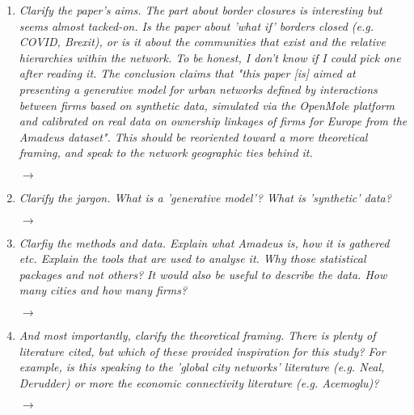 \documentclass[10pt,a4paper,sans]{moderncv}        %
\begin{document}
\begin{enumerate}
	

	\item \textit{Clarify the paper's aims. The part about border closures is interesting but seems almost tacked-on. Is the paper about 'what if' borders closed (e.g. COVID, Brexit), or is it about the communities that exist and the relative hierarchies within the network. To be honest, I don't know if I could pick one after reading it. The conclusion claims that "this paper [is] aimed at presenting a generative model for urban networks defined by interactions between firms based on synthetic data, simulated via the OpenMole platform and calibrated on real data on ownership linkages of firms for Europe from the Amadeus dataset". This should be reoriented toward a more theoretical framing, and speak to the network geographic ties behind it.}
	
	$\rightarrow$ 
	
	\medskip

	\item \textit{Clarify the jargon. What is a 'generative model'? What is 'synthetic' data?}

	$\rightarrow$ 
	
	\medskip

	\item \textit{Clarfiy the methods and data. Explain what Amadeus is, how it is gathered etc. Explain the tools that are used to analyse it. Why those statistical packages and not others? It would also be useful to describe the data. How many cities and how many firms?}
	
	$\rightarrow$ 
	
	\medskip

	\item \textit{And most importantly, clarify the theoretical framing. There is plenty of literature cited, but which of these provided inspiration for this study? For example, is this speaking to the 'global city networks' literature (e.g. Neal, Derudder) or more the economic connectivity literature (e.g. Acemoglu)?}
	 
	$\rightarrow$ 
	
	\medskip


\end{enumerate}
\end{document}
